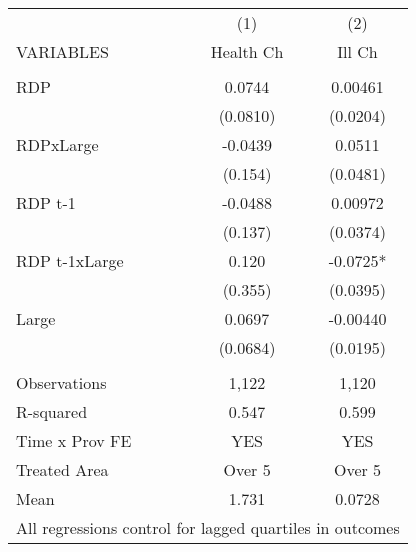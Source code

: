 \begin{tabular}{lcc} \hline
 & (1) & (2) \\
VARIABLES & Health Ch & Ill Ch \\ \hline
 &  &  \\
RDP & 0.0744 & 0.00461 \\
 & (0.0810) & (0.0204) \\
RDPxLarge & -0.0439 & 0.0511 \\
 & (0.154) & (0.0481) \\
RDP t-1 & -0.0488 & 0.00972 \\
 & (0.137) & (0.0374) \\
RDP t-1xLarge & 0.120 & -0.0725* \\
 & (0.355) & (0.0395) \\
Large & 0.0697 & -0.00440 \\
 & (0.0684) & (0.0195) \\
 &  &  \\
Observations & 1,122 & 1,120 \\
R-squared & 0.547 & 0.599 \\
Time x Prov FE & YES & YES \\
Treated Area & Over 5 & Over 5 \\
 Mean & 1.731 & 0.0728 \\ \hline
\multicolumn{3}{c}{ All regressions control for lagged quartiles in outcomes} \\
\end{tabular}
